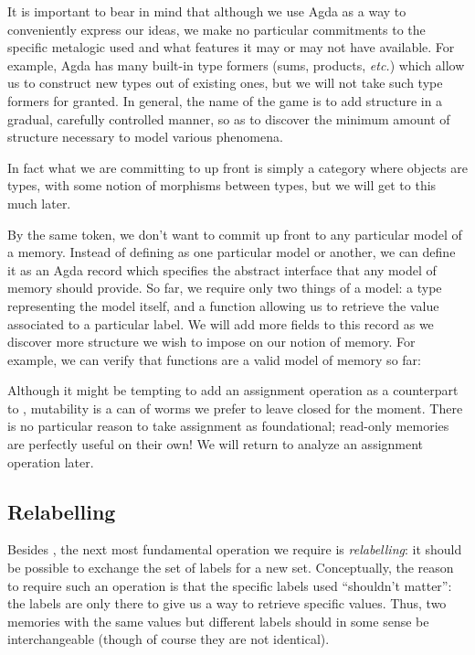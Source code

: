 \documentclass{jfp}
\begin{document}
It is important to bear in mind that although we use Agda as a way to
conveniently express our ideas, we make no particular commitments to
the specific metalogic used and what features it may or may not have
available.  For example, Agda has many built-in type formers (sums,
products, \emph{etc.}) which allow us to construct new types out of
existing ones, but we will not take such type formers for granted.  In
general, the name of the game is to add structure in a gradual,
carefully controlled manner, so as to discover the minimum amount of
structure necessary to model various phenomena.

\begin{commentary}
  In fact what we are committing to up front is simply a category
  where objects are types, with some notion of morphisms between
  types, but we will get to this much later.
\end{commentary}

By the same token, we don't want to commit up front to any particular
model of a memory.  Instead of defining  as one
particular model or another, we can define it as an Agda record which
specifies the abstract interface that any model of memory should
provide.  So far, we require only two things of a model: a type
 representing the model itself, and a function
 allowing us to retrieve the value associated to a
particular label.  We will add more fields to this record as we
discover more structure we wish to impose on our notion of memory.
%
%
For example, we can verify that functions are a valid model of memory
so far:
%

Although it might be tempting to add an assignment operation as a
counterpart to , mutability is a can of worms we
prefer to leave closed for the moment.  There is no particular reason
to take assignment as foundational; read-only memories are perfectly
useful on their own!  We will return to analyze an assignment
operation later.

\subsection{Relabelling}
\label{sec:relabelling}

Besides , the next most fundamental operation we
require is \emph{relabelling}: it should be possible to exchange the
set of labels for a new set.  Conceptually, the reason to require such
an operation is that the specific labels used ``shouldn't matter'':
the labels are only there to give us a way to retrieve specific
values.  Thus, two memories with the same values but different labels
should in some sense be interchangeable (though of course they are not
identical).
\end{document}
